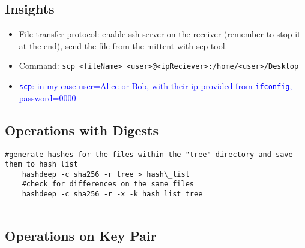 \subsection*{Insights}
\begin{itemize}
	\item File-transfer protocol: enable ssh server on the receiver (remember to stop it at the end), send the file from the mittent with scp tool.
	\item Command: \texttt{scp <fileName> <user>@<ipReciever>:/home/<user>/Desktop}
	\item \textcolor{Blue}{\texttt{scp}: in my case user=Alice or Bob, with their ip provided from \texttt{ifconfig}, password=0000}
\end{itemize}

\subsection*{Operations with Digests}

\begin{lstlisting}[style=bashStyle]
	#generate hashes for the files within the "tree" directory and save them to hash_list
	hashdeep -c sha256 -r tree > hash\_list
	#check for differences on the same files
	hashdeep -c sha256 -r -x -k hash list tree
	
\end{lstlisting}


\clearpage

\subsection*{Operations on Key Pair}

